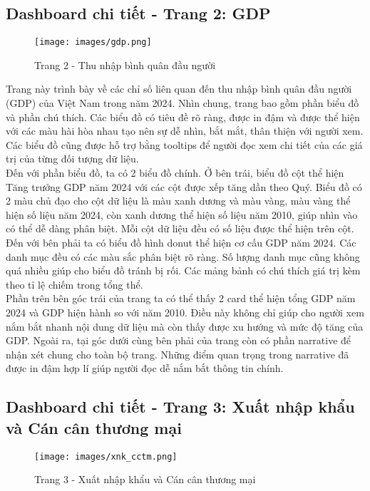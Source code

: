 \documentclass[a4paper]{report}
\begin{document}
{{\newpage
\subsection{Dashboard chi tiết - Trang 2: GDP}

\begin{figure}[H]
    \centering
    \texttt{[image: images/gdp.png]}
    \caption{Trang 2 - Thu nhập bình quân đầu người}
    \label{fig:enter-label}
\end{figure}

Trang này trình bày về các chỉ số liên quan đến thu nhập bình quân đầu người (GDP) của Việt Nam trong năm 2024. Nhìn chung, trang bao gồm phần biểu đồ và phần chú thích. Các biểu đồ có tiêu đề rõ ràng, được in đậm và được thể hiện với các màu hài hòa nhau tạo nên sự dễ nhìn, bắt mắt, thân thiện với người xem. Các biểu đồ cũng được hỗ trợ bằng tooltips để người đọc xem chi tiết của các giá trị của từng đối tượng dữ liệu.\\
Đến với phần biểu đồ, ta có 2 biểu đồ chính. Ở bên trái, biểu đồ cột thể hiện Tăng trưởng GDP năm 2024 với các cột được xếp tăng dần theo Quý. Biểu đồ có 2 màu chủ đạo cho cột dữ liệu là màu xanh dương và màu vàng, màu vàng thể hiện số liệu năm 2024, còn xanh dương thể hiện số liệu năm 2010, giúp nhìn vào có thể dễ dàng phân biệt. Mỗi cột dữ liệu đều có số liệu được thể hiện trên cột. Đến với bên phải ta có biểu đồ hình donut thể hiện cơ cấu GDP năm 2024. Các danh mục đều có các màu sắc phân biệt rõ ràng. Số lượng danh mục cũng không quá nhiều giúp cho biểu đồ tránh bị rối. Các mảng bảnh có chú thích giá trị kèm theo tỉ lệ chiếm trong tổng thể.\\
Phần trên bên góc trái của trang ta có thể thấy 2 card thể hiện tổng GDP năm 2024 và GDP hiện hành so với năm 2010. Điều này không chỉ giúp cho người xem nắm bắt nhanh nội dung dữ liệu mà còn thấy được xu hướng và mức độ tăng của GDP. Ngoài ra, tại góc dưới cùng bên phải của trang còn có phần narrative để nhận xét chung cho toàn bộ trang. Những điểm quan trọng trong narrative đã được in đậm hợp lí giúp người đọc dễ nắm bắt thông tin chính.
\newpage
\subsection{Dashboard chi tiết - Trang 3: Xuất nhập khẩu và Cán cân thương mại}


\begin{figure}[H]
    \centering
    \texttt{[image: images/xnk\_cctm.png]}
    \caption{Trang 3 - Xuất nhập khẩu và Cán cân thương mại}
    \label{fig:enter-label}
\end{figure}

}}
\end{document}
